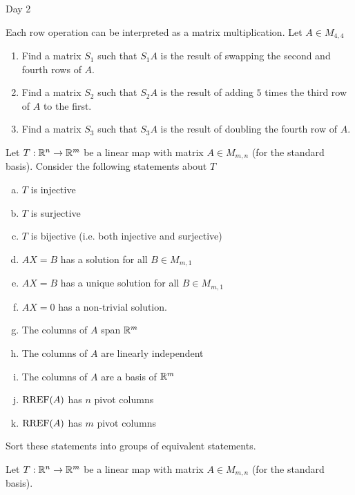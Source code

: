 
\begin{applicationActivities}{Day 2}

\begin{activity}
Each row operation can be interpreted as a matrix multiplication.  Let $A \in M_{4,4}$
\begin{enumerate}[1)]
\item Find a matrix $S_1$ such that $S_1A$ is the result of swapping the second and fourth rows of $A$.
\item Find a matrix $S_2$ such that $S_2A$ is the result of adding $5$ times the third row of $A$ to the first.
\item Find a matrix $S_3$ such that $S_3A$ is the result of doubling the fourth row of $A$.
\end{enumerate}
\end{activity}


\begin{activity}
Let $T: \mathbb{R}^n \rightarrow \mathbb{R}^m$ be a linear map with matrix $A \in M_{m,n}$ (for the standard basis).  Consider the following statements about $T$
\begin{enumerate}[(a)]
\item $T$ is injective
\item $T$ is surjective
\item $T$ is bijective (i.e. both injective and surjective)
\item $AX=B$ has a solution for all $B \in M_{m,1}$
\item $AX=B$ has a unique solution for all $B \in M_{m,1}$
\item $AX=0$ has a non-trivial solution.
\item The columns of $A$ span $\mathbb{R}^m$
\item The columns of $A$ are linearly independent
\item The columns of $A$ are a basis of $\mathbb{R}^m$
\item $\operatorname{RREF}(A)$ has $n$ pivot columns
\item $\operatorname{RREF}(A)$ has $m$ pivot columns
\end{enumerate}

Sort these statements into groups of equivalent statements.

\end{activity}

\begin{activity}
Let $T: \mathbb{R}^n \rightarrow \mathbb{R}^m$ be a linear map with matrix $A \in M_{m,n}$ (for the standard basis).


\end{activity}
\end{applicationActivities}
